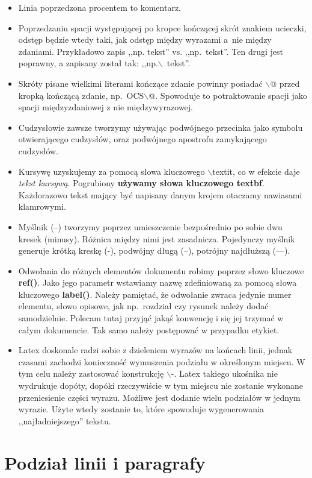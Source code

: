\documentclass[twoside,a4paper]{book}
\begin{document}
\begin{itemize}
 \item Linia poprzedzona procentem to komentarz.
 \item Poprzedzaniu spacji występującej po kropce kończącej skrót znakiem ucieczki, odstęp będzie wtedy taki, jak odstęp między wyrazami a~nie między zdaniami. Przykładowo zapis ,,np. tekst'' vs. ,,np.\ tekst''. Ten drugi jest poprawny, a zapisany został tak: ,,np.$\backslash$~tekst''.
 \item Skróty pisane wielkimi literami kończące zdanie powinny posiadać {$\backslash$}@ przed kropką kończącą zdanie, np.\ OCS{$\backslash$}@\@. Spowoduje to potraktowanie spacji jako spacji międzyzdaniowej z nie międzywyrazowej.
 \item Cudzysłowie zawsze tworzymy używając podwójnego przecinka jako symbolu otwierającego cudzysłów, oraz podwójnego apostrofu zamykającego cudzysłów.
 \item Kursywę uzyskujemy za pomocą słowa kluczowego {$\backslash$}textit, co w efekcie daje \textit{tekst kursywą}. Pogrubiony \textbf{używamy słowa kluczowego textbf}. Każdorazowo tekst mający być napisany danym krojem otaczamy nawiasami klamrowymi.
 \item Myślnik (--) tworzymy poprzez umieszczenie bezpośrednio po sobie dwu kresek (minusy). Różnica między nimi jest zasadnicza. Pojedynczy myślnik generuje krótką kreskę (-), podwójny długą (--), potrójny najdłuższą (---).
 \item Odwołania do różnych elementów dokumentu robimy poprzez słowo kluczowe \textbf{ref()}. Jako jego parametr wstawiamy nazwę zdefiniowaną za pomocą słowa kluczowego \textbf{label()}. Należy pamiętać, że odwołanie zwraca jedynie numer elementu, słowo opisowe, jak np.\ rozdział czy rysunek należy dodać samodzielnie. Polecam tutaj przyjąć jakąś konwencję i się jej trzymać w całym dokumencie. Tak samo należy postępować w przypadku etykiet.
 \item Latex doskonale radzi sobie z dzieleniem wyrazów na końcach linii, jednak czasami zachodzi konieczność wymuszenia podziału w określonym miejscu. W tym celu należy zastosować konstrukcję $\backslash$-. Latex takiego ukośnika nie wydrukuje dopóty, dopóki rzeczywiście w tym miejscu nie zostanie wykonane przeniesienie części wyrazu. Możliwe jest dodanie wielu podziałów w jednym wyrazie. Użyte wtedy zostanie to, które spowoduje wygenerowania ,,najładniejszego'' tekstu.
\end{itemize}

\section{Podział linii i paragrafy}
\label{podzial}
\end{document}
